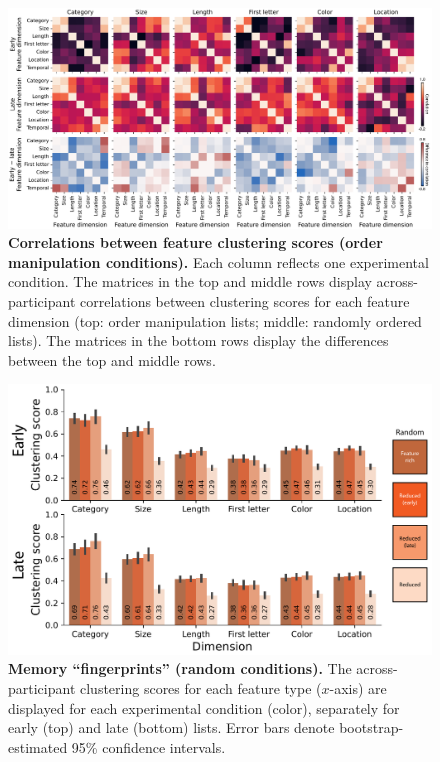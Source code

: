 \documentclass{article}
\begin{document}
\begin{figure}[tp] \centering
    \includegraphics[width=\textwidth]{figures/clustering_correlations}
    
    \caption{\textbf{Correlations between feature clustering scores (order manipulation conditions).}  Each column reflects one experimental condition.  The matrices in the top and middle
    rows display across-participant correlations between clustering scores for each feature dimension (top: order manipulation lists; middle: randomly ordered lists).  The matrices
    in the bottom rows display the differences between the top and middle rows.}
        \label{fig:clustering-correlations}
\end{figure}


\begin{figure}[tp] \centering
    \includegraphics[width=\textwidth]{figures/fingerprints_random}
    
\caption{\textbf{Memory ``fingerprints'' (random conditions).} The
across-participant clustering scores for each feature type ($x$-axis) are
displayed for each experimental condition (color), separately for early (top)
and late (bottom) lists. Error bars denote bootstrap-estimated 95\% confidence
intervals.}

\label{fig:fingerprints-random} \end{figure}
    
\end{document}
